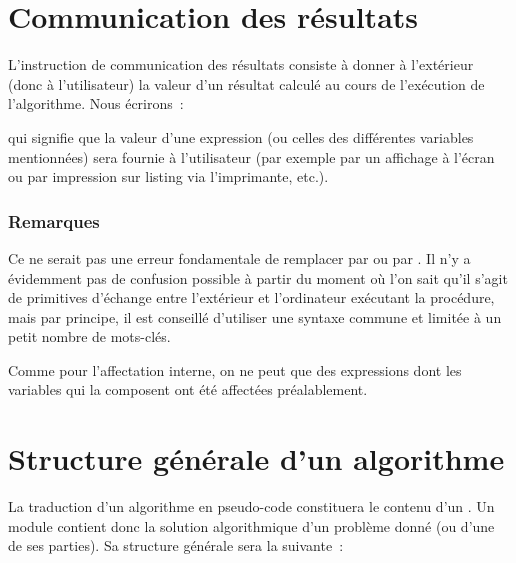 	\section{Communication des résultats}

		L’instruction de communication des résultats consiste à donner à
		l’extérieur (donc à l’utilisateur) la valeur d’un résultat 
		calculé au cours de l’exécution de l’algorithme. Nous écrirons~:


		qui signifie que la valeur d’une expression (ou celles des différentes
		variables mentionnées) sera fournie à l’utilisateur (par exemple par un
		affichage à l’écran ou par impression sur listing via l’imprimante,
		etc.).

		\subsubsection*{Remarques}

		\begin{liste}
		\item
			Ce ne serait pas une erreur fondamentale de remplacer
			 par  ou
			 par . Il n’y a
			évidemment pas de confusion possible à partir du moment où l’on sait
			qu’il s’agit de primitives d’échange entre l’extérieur et l’ordinateur
			exécutant la procédure, mais par principe, il est conseillé d’utiliser
			une syntaxe commune et limitée à un petit nombre de mots-clés.
		\item
			Comme pour l’affectation interne, on ne peut 
			que des expressions dont les variables qui la composent ont été 
			affectées préalablement.
		\end{liste}

	\section{Structure générale d’un algorithme}

		La traduction d’un algorithme en pseudo-code constituera le contenu d’un
		. Un module contient donc la solution
		algorithmique d’un problème donné (ou d’une de ses parties). Sa
		structure générale sera la suivante~:

